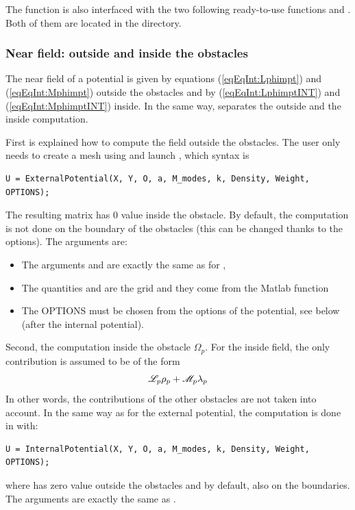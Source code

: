 \begin{remark}
The  function is also interfaced with the two following ready-to-use functions  and . Both of them are located in the  directory.
\end{remark}


\subsubsection{Near field: outside and inside the obstacles}

The near field of a potential is given by equations (\ref{eqEqInt:Lphimpt}) and (\ref{eqEqInt:Mphimpt}) outside the obstacles and by (\ref{eqEqInt:LphimptINT}) and (\ref{eqEqInt:MphimptINT}) inside. In the same way, \mudiff separates the outside and the inside computation. 

First is explained how to compute the field outside the obstacles. The user only needs to create a mesh using \eg {} and launch , which syntax is
\begin{lstlisting}
U = ExternalPotential(X, Y, O, a, M_modes, k, Density, Weight, OPTIONS);
\end{lstlisting}
The resulting matrix  has $0$ value inside the obstacle. By default, the computation is not done on the boundary of the obstacles (this can be changed thanks to the options). The arguments are:
\begin{itemize}
\item The arguments  and  are exactly the same as for ,
\item The quantities  and  are the grid and they come from the Matlab  function
\item The OPTIONS must be chosen from the options of the potential, see below (after the internal potential).
\end{itemize}

Second, the computation inside the obstacle $\Omega_p$. For the inside field, the only contribution is assumed to be of the form 
$$
{\mathscr L}_p\rho_p + {\mathscr M}_p\lambda_p
$$
In other words, the contributions of the other obstacles are not taken into account. In the same way as for the external potential, the computation is done in \mudiff with:
\begin{lstlisting}
U = InternalPotential(X, Y, O, a, M_modes, k, Density, Weight, OPTIONS);
\end{lstlisting}
where  has zero value outside the obstacles and by default, also on the boundaries. The arguments are exactly the same as .

